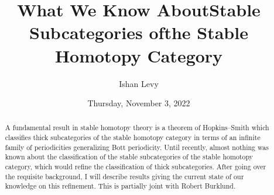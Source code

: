\documentclass{UAmathtalk}
\author{Ishan Levy}
\title{What We Know About\linebreak Stable Subcategories of\linebreak the Stable Homotopy Category}
\date{Thursday, November 3, 2022}
\begin{document}
\maketitle

\begin{abstract}
A fundamental result in stable homotopy theory is a theorem of Hopkins--Smith which classifies thick subcategories of the stable homotopy category in terms of an infinite family of periodicities generalizing Bott periodicity. Until recently, almost nothing was known about the classification of the stable subcategories of the stable homotopy category, which would refine the classification of thick subcategories. After going over the requisite background, I will describe results giving the current state of our knowledge on this refinement. This is partially joint with Robert Burklund.
\end{abstract}
\end{document}
